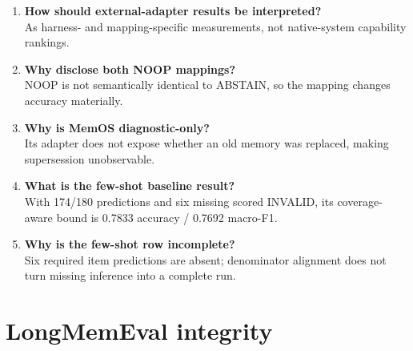 \begin{enumerate}
\def\labelenumi{\arabic{enumi}.}
\setcounter{enumi}{36}
\item
  \textbf{How should external-adapter results be interpreted?}\\
  As harness- and mapping-specific measurements, not native-system
  capability rankings.
\item
  \textbf{Why disclose both NOOP mappings?}\\
  NOOP is not semantically identical to ABSTAIN, so the mapping changes
  accuracy materially.
\item
  \textbf{Why is MemOS diagnostic-only?}\\
  Its adapter does not expose whether an old memory was replaced, making
  supersession unobservable.
\item
  \textbf{What is the few-shot baseline result?}\\
  With 174/180 predictions and six missing scored INVALID, its
  coverage-aware bound is 0.7833 accuracy / 0.7692 macro-F1.
\item
  \textbf{Why is the few-shot row incomplete?}\\
  Six required item predictions are absent; denominator alignment does
  not turn missing inference into a complete run.
\end{enumerate}

\section{LongMemEval integrity}\label{longmemeval-integrity}

